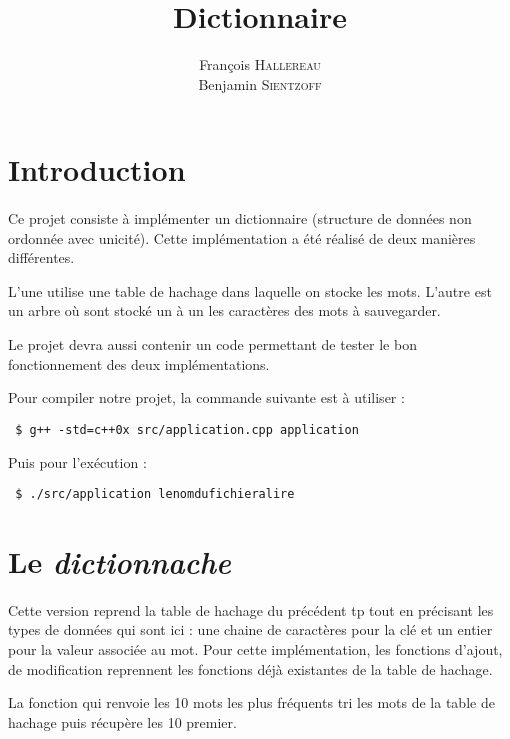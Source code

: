 \documentclass[12pt,a4paper,final]{article}
\author{François \textsc{Hallereau} \\ Benjamin \textsc{Sientzoff}}
\title{Dictionnaire}
\begin{document}
\maketitle

\vspace{5cm}

\tableofcontents

\newpage

\section*{Introduction}
\paragraph{}{
Ce projet consiste à implémenter un dictionnaire (structure de données non ordonnée avec unicité). Cette implémentation a été réalisé de deux manières différentes. 

L'une utilise une table de hachage dans laquelle on stocke les mots. L'autre est un arbre où sont stocké un à un les caractères des mots à sauvegarder.

Le projet devra aussi contenir un code permettant de tester le bon fonctionnement des deux implémentations.

Pour compiler notre projet, la commande suivante est à utiliser :
\begin{verbatim}
 $ g++ -std=c++0x src/application.cpp application
\end{verbatim}

Puis pour l'exécution :
\begin{verbatim}
 $ ./src/application lenomdufichieralire
\end{verbatim}
}


\newpage

\section{Le \emph{dictionnache}}
\paragraph{}{
Cette version reprend la table de hachage du précédent tp tout en précisant les types de données qui sont ici : une chaine de caractères pour la clé et un entier pour la valeur associée au mot.
Pour cette implémentation, les fonctions d'ajout, de modification reprennent les fonctions déjà existantes de la table de hachage.

La fonction qui renvoie les 10 mots les plus fréquents tri les mots de la table de hachage puis récupère les 10 premier.
}
\newpage 
\end{document}
